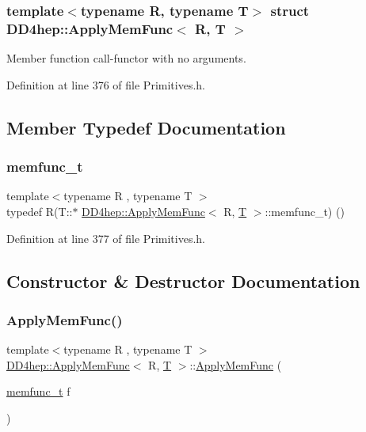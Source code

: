 \subsubsection*{template$<$typename R, typename T$>$\newline
struct D\+D4hep\+::\+Apply\+Mem\+Func$<$ R, T $>$}

Member function call-\/functor with no arguments. 

Definition at line 376 of file Primitives.\+h.



\subsection{Member Typedef Documentation}
\hypertarget{struct_d_d4hep_1_1_apply_mem_func_ab5971c00734a619f31885e8d0fa156f0}{}\label{struct_d_d4hep_1_1_apply_mem_func_ab5971c00734a619f31885e8d0fa156f0} 
\subsubsection{\texorpdfstring{memfunc\+\_\+t}{memfunc\_t}}
{\footnotesize\ttfamily template$<$typename R , typename T $>$ \\
typedef R(T\+::$\ast$ \hyperlink{struct_d_d4hep_1_1_apply_mem_func}{D\+D4hep\+::\+Apply\+Mem\+Func}$<$ R, \hyperlink{class_t}{T} $>$\+::memfunc\+\_\+t) ()}



Definition at line 377 of file Primitives.\+h.



\subsection{Constructor \& Destructor Documentation}
\hypertarget{struct_d_d4hep_1_1_apply_mem_func_a6bf11f21888593fa22e7c4a354b9f965}{}\label{struct_d_d4hep_1_1_apply_mem_func_a6bf11f21888593fa22e7c4a354b9f965} 
\subsubsection{\texorpdfstring{Apply\+Mem\+Func()}{ApplyMemFunc()}}
{\footnotesize\ttfamily template$<$typename R , typename T $>$ \\
\hyperlink{struct_d_d4hep_1_1_apply_mem_func}{D\+D4hep\+::\+Apply\+Mem\+Func}$<$ R, \hyperlink{class_t}{T} $>$\+::\hyperlink{struct_d_d4hep_1_1_apply_mem_func}{Apply\+Mem\+Func} (\begin{DoxyParamCaption}\item[{\hyperlink{struct_d_d4hep_1_1_apply_mem_func_ab5971c00734a619f31885e8d0fa156f0}{memfunc\+\_\+t}}]{f }\end{DoxyParamCaption})\hspace{0.3cm}{\ttfamily [inline]}}



